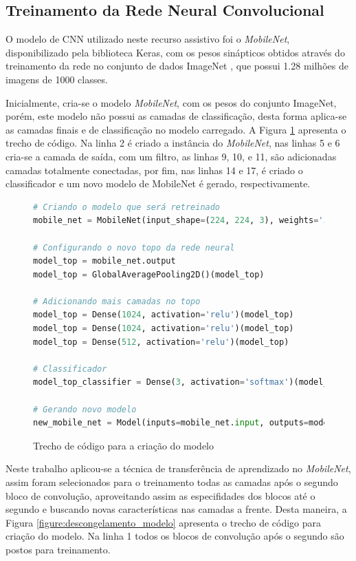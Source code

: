 \subsection{Treinamento da Rede Neural Convolucional}

\par O modelo de CNN utilizado neste recurso assistivo foi o \textit{MobileNet}, disponibilizado pela biblioteca Keras, com os pesos sinápticos obtidos através do treinamento da rede no conjunto de dados ImageNet \cite{Russakovsky2015}, que possui 1.28 milhões de imagens de 1000 classes.

\par Inicialmente, cria-se o modelo \textit{MobileNet}, com os pesos do conjunto ImageNet, porém, este modelo não possui as camadas de classificação, desta forma aplica-se as camadas finais e de classificação no modelo carregado. A Figura \ref{figure:criacao_do_modelo} apresenta o trecho de código. Na linha 2 é criado a instância do \textit{MobileNet}, nas linhas 5 e 6 cria-se a camada de saída, com um filtro, as linhas 9, 10, e 11, são adicionadas camadas totalmente conectadas, por fim, nas linhas 14 e 17, é criado o classificador e um novo modelo de MobileNet é gerado, respectivamente.

\begin{figure}[H]
    \centering
    \begin{lstlisting}[language=Python]
# Criando o modelo que será retreinado
mobile_net = MobileNet(input_shape=(224, 224, 3), weights='imagenet', include_top=False)

# Configurando o novo topo da rede neural
model_top = mobile_net.output
model_top = GlobalAveragePooling2D()(model_top)

# Adicionando mais camadas no topo
model_top = Dense(1024, activation='relu')(model_top)
model_top = Dense(1024, activation='relu')(model_top) 
model_top = Dense(512, activation='relu')(model_top)

# Classificador
model_top_classifier = Dense(3, activation='softmax')(model_top)

# Gerando novo modelo
new_mobile_net = Model(inputs=mobile_net.input, outputs=model_top_classifier)
    \end{lstlisting}
    \caption{Trecho de código para a criação do modelo}
    \label{figure:criacao_do_modelo}
\end{figure}

\par Neste trabalho aplicou-se a técnica de transferência de aprendizado no \textit{MobileNet}, assim foram selecionados para o treinamento todas as camadas após o segundo bloco de convolução, aproveitando assim as especifidades dos blocos até o segundo e buscando novas características nas camadas a frente. Desta maneira, a Figura \ref{figure:descongelamento_modelo} apresenta o trecho de código para criação do modelo. Na linha 1 todos os blocos de convolução após o segundo são postos para treinamento.

